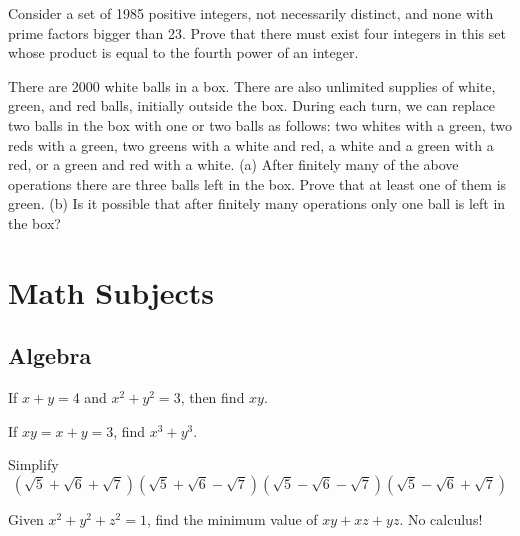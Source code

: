 \documentclass[12pt]{article}
\begin{document}
        \begin{exercise}[IMO 1985]
            Consider a set of 1985 positive integers, not necessarily distinct, and none with prime factors bigger than 23. Prove that there must exist four integers in this set whose product is equal to the fourth power of an integer.
        \end{exercise}
    
        \begin{exercise}
            There are 2000 white balls in a box. There are also unlimited supplies of white, green, and red balls, initially outside the box. During each turn, we can replace two balls in the box with one or two balls as follows: two whites with a green, two reds with a green, two greens with a white and red, a white and a green with a red, or a green and red with a white. (a) After finitely many of the above operations there are three balls left in the box. Prove that at least one of them is green. (b) Is it possible that after finitely many operations only one ball is left in the box?
        \end{exercise}

\section{Math Subjects}

    \subsection{Algebra}

        \begin{exercise}
            If $x+y = 4$ and $x^2 + y^2 = 3$, then find $xy$.
        \end{exercise}

        \begin{exercise}
            If $xy=x+y = 3$, find $x^3+y^3$.
        \end{exercise}

        \begin{exercise}
            Simplify
            \[\left(\sqrt{5}+\sqrt{6}+\sqrt{7}\right)\left(\sqrt{5}+\sqrt{6}-\sqrt{7}\right)\left(\sqrt{5}-\sqrt{6}-\sqrt{7}\right)\left(\sqrt{5}-\sqrt{6}+\sqrt{7}\right)\]
        \end{exercise}

        \begin{exercise}
            Given $x^2 + y^2 + z^2 = 1$, find the minimum value of $xy+xz+yz$. No calculus!
        \end{exercise}
\end{document}
